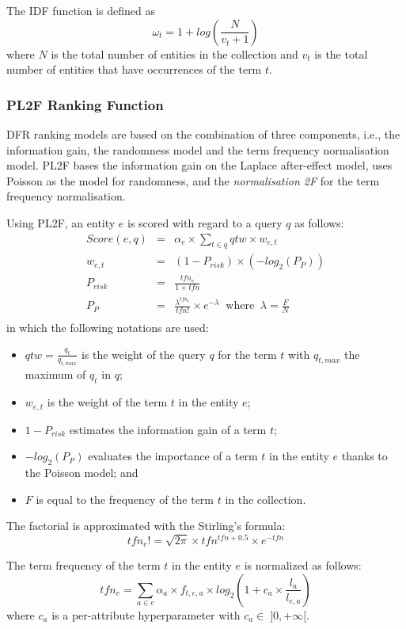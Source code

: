 The IDF function is defined as
$$
\omega_t=1+log\left(\frac{N}{v_t+1}\right)
$$
where $N$ is the total number of entities in the collection and $v_t$ is the total number of entities that have occurrences of the term $t$.

\subsubsection{PL2F Ranking Function}

DFR ranking models are based on the combination of three components, i.e., the information gain, the randomness model and the term frequency normalisation model. PL2F bases the information gain on the Laplace after-effect model, uses Poisson as the model for randomness, and the \emph{normalisation 2F} for the term frequency normalisation.

Using PL2F, an entity $e$ is scored with regard to a query $q$ as follows:
\begin{eqnarray*}
	Score(e,q) & = & \alpha_e\times\sum_{t\in q}{qtw \times w_{e,t}}\\
	\label{eq:dfr-score}
	w_{e,t} & = & \left(1-P_{risk}\right) \times \left(-log_2\left(P_{P}\right)\right) \\
	\label{eq:dfr-term-weight}
	P_{risk} & = & \frac{tfn_e}{1+tfn} \\
	\label{eq:dfr-prisk}
	P_{P} & = & \frac{\lambda^{tfn_e}}{tfn!}\times e^{-\lambda} \:\text{ where }\: \lambda=\frac{F}{N} \\
	\label{eq:dfr:rand-poisson}
\end{eqnarray*}
in which the following notations are used:
\begin{itemize}
	\item $qtw=\frac{q_t}{q_{t,max}}$ is the weight of the query $q$ for the term $t$ with $q_{t,max}$ the maximum of $q_t$ in $q$;
	\item $w_{e,t}$ is the weight of the term $t$ in the entity $e$;
	\item $1-P_{risk}$ estimates the information gain of a term $t$;
	\item $-log_2\left(P_{P}\right)$ evaluates the importance of a term $t$ in the entity $e$ thanks to the Poisson model; and
	\item $F$ is equal to the frequency of the term $t$ in the collection.
\end{itemize}

The factorial is approximated with the Stirling's formula:
$$
tfn_e!=\sqrt{2\pi}\times tfn^{tfn+0.5}\times e^{-tfn}
$$

The term frequency of the term $t$ in the entity $e$ is normalized as follows:
\begin{equation}
tfn_e = \sum_{a\in e}{\alpha_a\times f_{t,e,a} \times log_2\left(1+c_a\times\frac{l_a}{l_{e,a}}\right)}
\label{eq:pl2f}
\end{equation}
where $c_a$ is a per-attribute hyperparameter with $c_a \in\;]0,+\infty[$.
